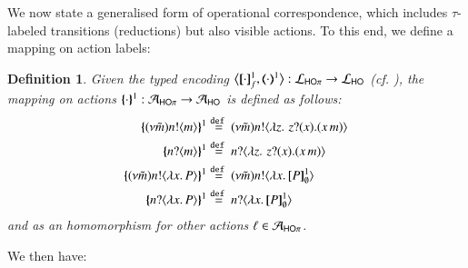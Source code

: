 \documentclass[preprint,11pt]{elsarticle}
\newtheorem{definition}{Definition}[section]
\begin{document}
{%
We now state a generalised form of operational correspondence, which includes $\tau$-labeled transitions (reductions) but also visible actions.
To this end, we define a mapping  on action labels: 
\begin{definition}\label{d:actmap1}
Given the typed encoding 
$\enco{\map{\cdot}^{1}_f, \mapt{\cdot}^{1} %
}: \tyl{L}_{\HOp} \to \tyl{L}_{\HO}$ (cf. ),
the mapping on actions $\{\!\!\{\cdot\}\!\!\}^{1}: \mathcal{A}_{\mathsf{HO}\pi} \to \mathcal{A}_{\mathsf{HO}}$
	is defined as follows:
	\begin{align*}
		\mapa{(\nu \tilde{m})\bactout{n}{m}}^{1}
		& \defeq
		(\nu \tilde{m})\bactout{n}{\abs{z}{\,\binp{z}{x} (\appl{x}{m})} }
		\\
		\mapa{\bactinp{n}{m}}^{1}
		& \defeq
		\bactinp{n}{\abs{z}{\,\binp{z}{x} (\appl{x}{m})} }
		\\
		\mapa{(\nu \tilde{m})\bactout{n}{\abs{{x}}{P}}}^{1}
		& \defeq
		(\nu \tilde{m})\bactout{n}{\abs{{x}}{\pmapp{P}{1}{\es}}}
		\\ 
		\mapa{\bactinp{n}{\abs{{x}}{P}}}^{1}
		& \defeq
		\bactinp{n}{\abs{{x}}{\pmapp{P}{1}{\es}}}
	\end{align*}
	and as an homomorphism for other actions $\ell \in \mathcal{A}_{\mathsf{HO}\pi}$.
	\end{definition}
	
	We then have:


}
\end{document}
